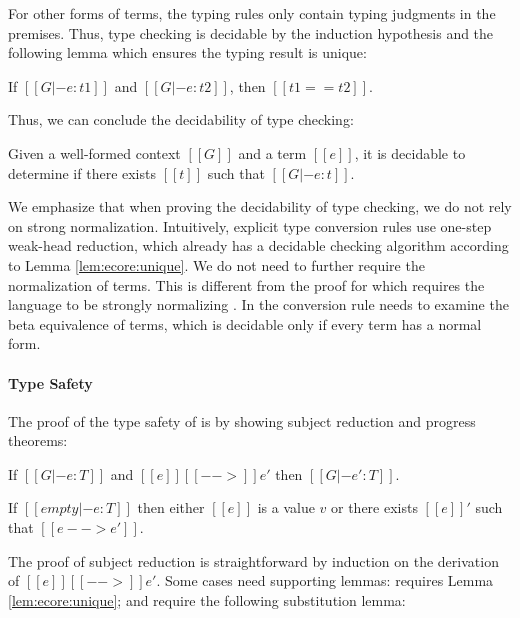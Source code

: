 For other forms of terms, the typing rules only contain typing
judgments in the premises. Thus, type checking is decidable by the
induction hypothesis and the following lemma which ensures the typing
result is unique:
\begin{lemma}
If $[[G |- e : t1]]$ and $[[G |- e : t2]]$, then $[[t1 == t2]]$.
\end{lemma}
Thus, we can conclude the decidability of type
checking:
\begin{theorem}\label{lem:ecore:decide}
Given a well-formed context $[[G]]$ and a term $[[e]]$, it is decidable
to determine if there exists $[[t]]$ such that $[[G |- e : t]]$.
\end{theorem}

We emphasize that when proving the decidability of type checking, we
do not rely on strong normalization. Intuitively,
explicit type conversion rules use one-step weak-head reduction, which already
has a decidable checking algorithm according to Lemma
\ref{lem:ecore:unique}. We do not need to further require the
normalization of terms. This is different from the proof for \cc which
requires the language to be strongly normalizing
\cite{pts:normalize}. In \cc the conversion rule needs to examine
the beta equivalence of terms, which is decidable only if every term
has a normal form.

\paragraph{Type Safety}
The proof of the type safety of \ecore is by showing subject reduction
and progress theorems:

\begin{theorem}\label{lem:ecore:reduct}
  If $[[G |- e:T]]$ and $[[e]] [[-->]] e'$ then $[[G |- e':T]]$.
\end{theorem}

\begin{theorem}\label{lem:ecore:prog}
  If $[[empty |- e:T]]$ then either $[[e]]$ is a value $v$ or there
  exists $[[e]]'$ such that $[[e --> e']]$.
\end{theorem}

The proof of subject reduction is straightforward by induction on the
derivation of $[[e]] [[-->]] e'$. Some cases need supporting lemmas:
 requires Lemma
\ref{lem:ecore:unique};  and  require
the following substitution lemma:

